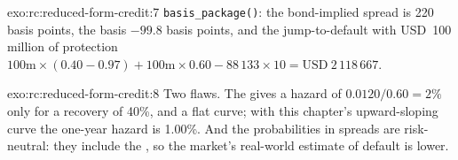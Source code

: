 \begin{solution}{exo:rc:reduced-form-credit:7}
\texttt{basis\_package()}: the bond-implied spread is 220 basis points, the basis
$-99.8$ basis points, and the jump-to-default with USD~100 million of protection
$100\text{m}\times(0.40-0.97)+100\text{m}\times0.60-88\,133\times10 = \text{USD}~2\,118\,667$.
\end{solution}

\begin{solution}{exo:rc:reduced-form-credit:8}
Two flaws. The  gives a hazard of $0.0120/0.60 = 2\%$ only for a recovery
of 40\%, and a flat curve; with this chapter's upward-sloping curve the one-year hazard is
1.00\%. And the probabilities in spreads are risk-neutral: they include the , so the market's real-world estimate of default is lower.
\end{solution}


